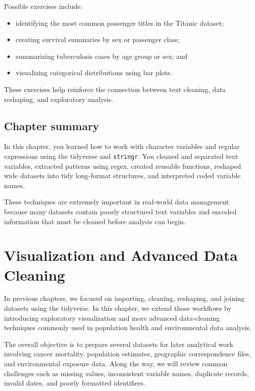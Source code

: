 \documentclass[
  11pt,
  oneside]{book}
\providecommand{\tightlist}{%
  \setlength{\itemsep}{0pt}\setlength{\parskip}{0pt}}
\begin{document}
Possible exercises include:

\begin{itemize}
\tightlist
\item
  identifying the most common passenger titles in the Titanic dataset;
\item
  creating survival summaries by sex or passenger class;
\item
  summarizing tuberculosis cases by age group or sex; and
\item
  visualizing categorical distributions using bar plots.
\end{itemize}

These exercises help reinforce the connection between text cleaning, data reshaping, and exploratory analysis.

\section{Chapter summary}\label{chapter-summary-4}

In this chapter, you learned how to work with character variables and regular expressions using the tidyverse and \texttt{stringr}. You cleaned and separated text variables, extracted patterns using regex, created reusable functions, reshaped wide datasets into tidy long-format structures, and interpreted coded variable names.

These techniques are extremely important in real-world data management because many datasets contain poorly structured text variables and encoded information that must be cleaned before analysis can begin.

\chapter{Visualization and Advanced Data Cleaning}\label{visualization-and-advanced-data-cleaning}

In previous chapters, we focused on importing, cleaning, reshaping, and joining datasets using the tidyverse. In this chapter, we extend those workflows by introducing exploratory visualization and more advanced data-cleaning techniques commonly used in population health and environmental data analysis.

The overall objective is to prepare several datasets for later analytical work involving cancer mortality, population estimates, geographic correspondence files, and environmental exposure data. Along the way, we will review common challenges such as missing values, inconsistent variable names, duplicate records, invalid dates, and poorly formatted identifiers.
\end{document}
